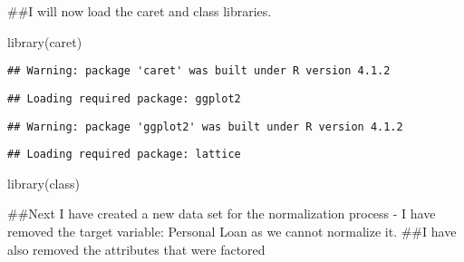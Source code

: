 \documentclass[
]{article}
\newenvironment{Shaded}{\begin{snugshade}}{\end{snugshade}}
\newcommand{\ConstantTok}[1]{\textcolor[rgb]{0.00,0.00,0.00}{#1}}
\newcommand{\FunctionTok}[1]{\textcolor[rgb]{0.00,0.00,0.00}{#1}}
\newcommand{\NormalTok}[1]{#1}
\newcommand{\OtherTok}[1]{\textcolor[rgb]{0.56,0.35,0.01}{#1}}
\newcommand{\SpecialCharTok}[1]{\textcolor[rgb]{0.00,0.00,0.00}{#1}}
\begin{document}
\#\#I will now load the caret and class libraries.

\begin{Shaded}
\begin{Highlighting}[]
\FunctionTok{library}\NormalTok{(caret)}
\end{Highlighting}
\end{Shaded}

\begin{verbatim}
## Warning: package 'caret' was built under R version 4.1.2
\end{verbatim}

\begin{verbatim}
## Loading required package: ggplot2
\end{verbatim}

\begin{verbatim}
## Warning: package 'ggplot2' was built under R version 4.1.2
\end{verbatim}

\begin{verbatim}
## Loading required package: lattice
\end{verbatim}

\begin{Shaded}
\begin{Highlighting}[]
\FunctionTok{library}\NormalTok{(class)}
\end{Highlighting}
\end{Shaded}

\#\#Next I have created a new data set for the normalization process - I
have removed the target variable: Personal Loan as we cannot normalize
it. \#\#I have also removed the attributes that were factored

\begin{Shaded}
\end{Shaded}
\end{document}

